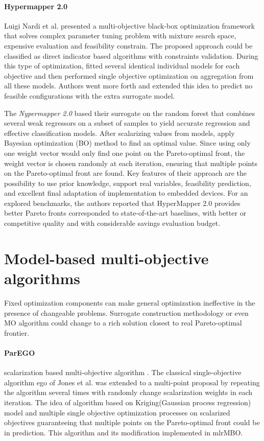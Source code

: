         \paragraph{Hypermapper 2.0} Luigi Nardi et al. \cite{nardi2019practical} presented a multi-objective black-box optimization framework that solves complex parameter tuning problem with mixture search space, expensive evaluation and feasibility constrain.
        The proposed approach could be classified as direct indicator based algorithms with constraints validation. During this type of optimization, fitted several identical individual models for each objective and then performed single objective optimization on aggregation from all these models. Authors went more forth and extended this idea to predict no feasible configurations with the extra surrogate model.
        
        The \emph{Nypermapper 2.0} based their surrogate on the random forest that combines several weak regressors on a subset of samples to yield accurate regression and effective classification models. After scalarizing values from models, apply Bayesian optimization (BO) method to find an optimal value.  Since using only one weight vector would only find one point on the Pareto-optimal front, the weight vector is chosen randomly at each iteration, ensuring that multiple points on the Pareto-optimal front are found. Key features of their approach are the possibility to use prior knowledge, support real variables, feasibility prediction, and excellent final adaptation of implementation to embedded devices. For an explored benchmarks, the authors reported that HyperMapper 2.0 provides better Pareto fronts corresponded to state-of-the-art baselines, with better or competitive quality and with considerable savings evaluation budget.
        

    \section{Model-based multi-objective algorithms}
        Fixed optimization components can make general optimization ineffective in the presence of changeable problems. Surrogate construction methodology or even MO algorithm could change to a rich solution closest to real Pareto-optimal frontier.

        \paragraph{ParEGO}\label{alg:ParEGO} scalarization based multi-objective algorithm \cite{Knowles06}. The classical single-objective algorithm \gls{ego} \cite{JonesSW98} of Jones et al. was extended to a multi-point proposal by repeating the algorithm several times with randomly change scalarization weights in each iteration.  The idea of algorithm based on Kriging(Gaussian process regression) model and multiple single objective optimization processes on scalarized objectives guaranteeing that multiple points on the Pareto-optimal front could be in prediction. This algorithm and its modification implemented in mlrMBO\cite{BischlmlrMBO}.


